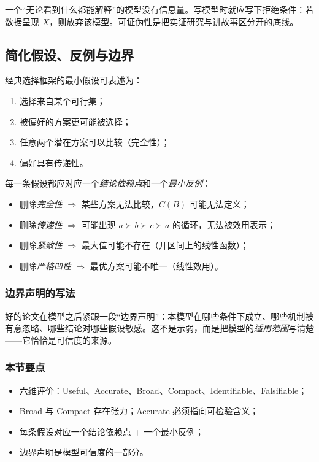 一个“无论看到什么都能解释”的模型没有信息量。写模型时就应写下拒绝条件：若数据呈现 $X$，则放弃该模型。可证伪性是把实证研究与讲故事区分开的底线。

\subsection{简化假设、反例与边界}

经典选择框架的最小假设可表述为：
\begin{enumerate}
  \item 选择来自某个可行集；
  \item 被偏好的方案更可能被选择；
  \item 任意两个潜在方案可以比较（完全性）；
  \item 偏好具有传递性。
\end{enumerate}

每一条假设都应对应一个\emph{结论依赖点}和一个\emph{最小反例}：
\begin{itemize}
  \item 删除\emph{完全性} $\Rightarrow$ 某些方案无法比较，$C(B)$ 可能无法定义；
  \item 删除\emph{传递性} $\Rightarrow$ 可能出现 $a\succ b\succ c\succ a$ 的循环，无法被效用表示；
  \item 删除\emph{紧致性} $\Rightarrow$ 最大值可能不存在（开区间上的线性函数）；
  \item 删除\emph{严格凹性} $\Rightarrow$ 最优方案可能不唯一（线性效用）。
\end{itemize}



\subsubsection*{边界声明的写法}


好的论文在模型之后紧跟一段“边界声明”：本模型在哪些条件下成立、哪些机制被有意忽略、哪些结论对哪些假设敏感。这不是示弱，而是把模型的\emph{适用范围}写清楚——它恰恰是可信度的来源。



\subsubsection*{本节要点}


\begin{itemize}
  \item 六维评价：Useful、Accurate、Broad、Compact、Identifiable、Falsifiable；
  \item Broad 与 Compact 存在张力；Accurate 必须指向可检验含义；
  \item 每条假设对应一个结论依赖点 + 一个最小反例；
  \item 边界声明是模型可信度的一部分。
\end{itemize}

